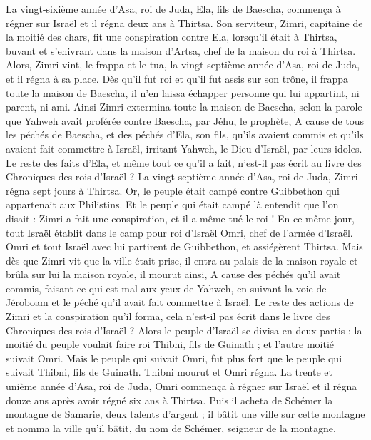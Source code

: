 \begin{multicols}{2}
La vingt-sixième année d'Asa, roi de Juda, Ela, fils de Baescha, commença à régner sur Israël et il régna deux ans à Thirtsa.
Son serviteur, Zimri, capitaine de la moitié des chars, fit une conspiration contre Ela, lorsqu'il était à Thirtsa, buvant et s'enivrant dans la maison d'Artsa, chef de la maison du roi à Thirtsa.
Alors, Zimri vint, le frappa et le tua, la vingt-septième année d'Asa, roi de Juda, et il régna à sa place.
Dès qu’il fut roi et qu'il fut assis sur son trône, il frappa toute la maison de Baescha, il n'en laissa échapper personne qui lui appartint, ni parent, ni ami.
Ainsi Zimri extermina toute la maison de Baescha, selon la parole que Yahweh avait proférée contre Baescha, par Jéhu, le prophète,
A cause de tous les péchés de Baescha, et des péchés d'Ela, son fils, qu’ils avaient commis et qu’ils avaient fait commettre à Israël, irritant Yahweh, le Dieu d'Israël, par leurs idoles.
Le reste des faits d'Ela, et même tout ce qu'il a fait, n'est-il pas écrit au livre des Chroniques des rois d'Israël ?
La vingt-septième année d'Asa, roi de Juda, Zimri régna sept jours à Thirtsa. Or, le peuple était campé contre Guibbethon qui appartenait aux Philistins.
Et le peuple qui était campé là entendit que l'on disait : Zimri a fait une conspiration, et il a même tué le roi ! En ce même jour, tout Israël établit dans le camp pour roi d’Israël Omri, chef de l'armée d'Israël.
Omri et tout Israël avec lui partirent de Guibbethon, et assiégèrent Thirtsa.
Mais dès que Zimri vit que la ville était prise, il entra au palais de la maison royale et brûla sur lui la maison royale, il mourut ainsi,
A cause des péchés qu’il avait commis, faisant ce qui est mal aux yeux de Yahweh, en suivant la voie de Jéroboam et le péché qu'il avait fait commettre à Israël.
Le reste des actions de Zimri et la conspiration qu'il forma, cela n’est-il pas écrit dans le livre des Chroniques des rois d'Israël ?
Alors le peuple d'Israël se divisa en deux partis : la moitié du peuple voulait faire roi Thibni, fils de Guinath ; et l'autre moitié suivait Omri.
Mais le peuple qui suivait Omri, fut plus fort que le peuple qui suivait Thibni, fils de Guinath. Thibni mourut et Omri régna.
La trente et unième année d'Asa, roi de Juda, Omri commença à régner sur Israël et il régna douze ans après avoir régné six ans à Thirtsa.
Puis il acheta de Schémer la montagne de Samarie, deux talents d'argent ; il bâtit une ville sur cette montagne et nomma la ville qu'il bâtit, du nom de Schémer, seigneur de la montagne.

\end{multicols}
